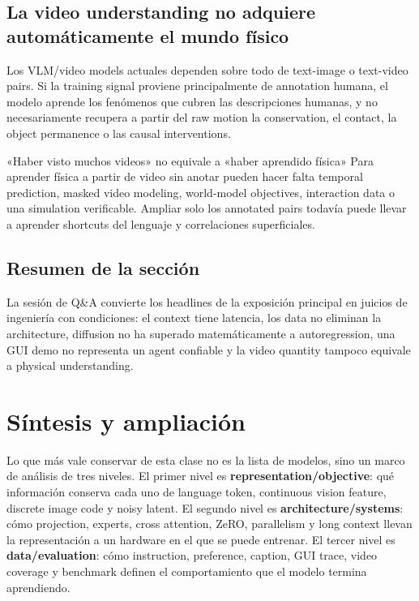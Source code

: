 \documentclass[a4paper]{article}
\begin{document}
\subsection{La video understanding no adquiere automáticamente el mundo físico}

Los VLM/video models actuales dependen sobre todo de text-image o text-video pairs. Si la training signal proviene principalmente de annotation humana, el modelo aprende los fenómenos que cubren las descripciones humanas, y no necesariamente recupera a partir del raw motion la conservation, el contact, la object permanence o las causal interventions.

\begin{warningbox}{«Haber visto muchos videos» no equivale a «haber aprendido física»}
Para aprender física a partir de video sin anotar pueden hacer falta temporal prediction, masked video modeling, world-model objectives, interaction data o una simulation verificable. Ampliar solo los annotated pairs todavía puede llevar a aprender shortcuts del lenguaje y correlaciones superficiales.
\end{warningbox}


\subsection{Resumen de la sección}

La sesión de Q\&A convierte los headlines de la exposición principal en juicios de ingeniería con condiciones: el context tiene latencia, los data no eliminan la architecture, diffusion no ha superado matemáticamente a autoregression, una GUI demo no representa un agent confiable y la video quantity tampoco equivale a physical understanding.
\section{Síntesis y ampliación}

Lo que más vale conservar de esta clase no es la lista de modelos, sino un marco de análisis de tres niveles. El primer nivel es \textbf{representation/objective}: qué información conserva cada uno de language token, continuous vision feature, discrete image code y noisy latent. El segundo nivel es \textbf{architecture/systems}: cómo projection, experts, cross attention, ZeRO, parallelism y long context llevan la representación a un hardware en el que se puede entrenar. El tercer nivel es \textbf{data/evaluation}: cómo instruction, preference, caption, GUI trace, video coverage y benchmark definen el comportamiento que el modelo termina aprendiendo.
\end{document}
